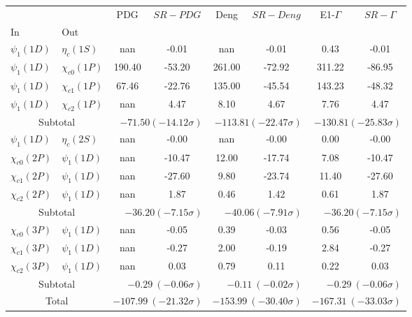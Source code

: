 \begin{tabular}{|l|l|c|c|c|c|c|c|}%
\hline%
&&PDG&$SR-PDG$&Deng&$SR-Deng$&E1-$\Gamma$&$SR-\Gamma$\\%
In&Out&&&&&&\\%
\hline%
$\psi_{1}(1D)$&$\eta_{c}(1S)$&nan&-0.01&nan&-0.01&0.43&-0.01\\%
$\psi_{1}(1D)$&$\chi_{c0}(1P)$&190.40&-53.20&261.00&-72.92&311.22&-86.95\\%
$\psi_{1}(1D)$&$\chi_{c1}(1P)$&67.46&-22.76&135.00&-45.54&143.23&-48.32\\%
$\psi_{1}(1D)$&$\chi_{c2}(1P)$&nan&4.47&8.10&4.67&7.76&4.47\\%
\hline%
\hline%
\multicolumn{2}{|c|}{Subtotal}&\multicolumn{2}{|r|}{$-71.50 (-14.12\sigma)$}&\multicolumn{2}{|r|}{$-113.81 (-22.47\sigma)$}&\multicolumn{2}{|r|}{$-130.81 (-25.83\sigma)$}\\%
\hline%
\hline%
$\psi_{1}(1D)$&$\eta_{c}(2S)$&nan&-0.00&nan&-0.00&0.00&-0.00\\%
$\chi_{c0}(2P)$&$\psi_{1}(1D)$&nan&-10.47&12.00&-17.74&7.08&-10.47\\%
$\chi_{c1}(2P)$&$\psi_{1}(1D)$&nan&-27.60&9.80&-23.74&11.40&-27.60\\%
$\chi_{c2}(2P)$&$\psi_{1}(1D)$&nan&1.87&0.46&1.42&0.61&1.87\\%
\hline%
\hline%
\multicolumn{2}{|c|}{Subtotal}&\multicolumn{2}{|r|}{$-36.20 (-7.15\sigma)$}&\multicolumn{2}{|r|}{$-40.06 (-7.91\sigma)$}&\multicolumn{2}{|r|}{$-36.20 (-7.15\sigma)$}\\%
\hline%
\hline%
$\chi_{c0}(3P)$&$\psi_{1}(1D)$&nan&-0.05&0.39&-0.03&0.56&-0.05\\%
$\chi_{c1}(3P)$&$\psi_{1}(1D)$&nan&-0.27&2.00&-0.19&2.84&-0.27\\%
$\chi_{c2}(3P)$&$\psi_{1}(1D)$&nan&0.03&0.79&0.11&0.22&0.03\\%
\hline%
\hline%
\multicolumn{2}{|c|}{Subtotal}&\multicolumn{2}{|r|}{$-0.29~(-0.06\sigma)$}&\multicolumn{2}{|r|}{$-0.11~(-0.02\sigma)$}&\multicolumn{2}{|r|}{$-0.29~(-0.06\sigma)$}\\%
\hline%
\hline%
\multicolumn{2}{|c|}{Total}&\multicolumn{2}{|r|}{$-107.99~(-21.32\sigma)$}&\multicolumn{2}{|r|}{$-153.99~(-30.40\sigma)$}&\multicolumn{2}{|r|}{$-167.31~(-33.03\sigma)$}\\%
\hline%
\end{tabular}